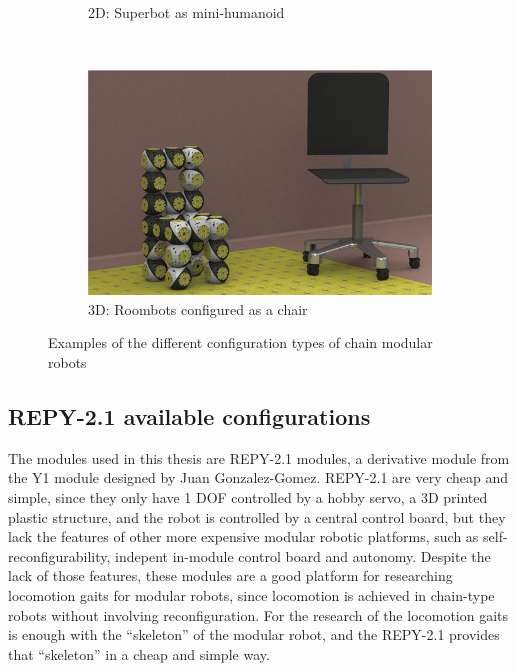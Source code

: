 \begin{figure}[h]
\begin{subfigure}[b]{0.3\textwidth}
                \caption{2D: Superbot as mini-humanoid}
                \label{fig:config_2D}
        \end{subfigure}
        ~
        \begin{subfigure}[b]{0.3\textwidth}
         	   \centering
                \includegraphics[width=\textwidth]{images/Conf_3D_roombots.jpg}
                \caption{3D: Roombots configured as a chair}
                \label{fig:config_3D}
        \end{subfigure}
        \caption{Examples of the different configuration types of chain modular robots}
        \label{fig:config_chain_examples_extended}
\end{figure}



\subsection{REPY-2.1 available configurations}
\label{config_repy_confs}
The modules used in this thesis are REPY-2.1 modules, a derivative module from the Y1 module designed by Juan Gonzalez-Gomez. REPY-2.1 are very cheap and simple, since they only have 1 DOF controlled by a hobby servo, a 3D printed plastic structure, and the robot is controlled by a central control board, but they lack the features of other more expensive modular robotic platforms, such as self-reconfigurability, indepent in-module control board and autonomy. Despite the lack of those features, these modules are a good platform for researching locomotion gaits for modular robots, since locomotion is achieved in chain-type robots without involving reconfiguration. For the research of the locomotion gaits is enough with the ``skeleton'' of the modular robot, and the REPY-2.1 provides that ``skeleton'' in a cheap and simple way.\\

